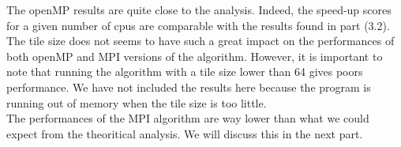 The openMP results are quite close to the analysis. Indeed, the speed-up scores for a given number of cpus are comparable with the results found in part (3.2). \\
 The tile size does not seems to have such a great impact on the performances of both openMP and MPI versions of the algorithm. However, it is important to note that running the algorithm with a tile size lower than 64 gives poors performance. We have not included the results here because the program is running out of memory when the tile size is too little. \\
The performances of the MPI algorithm are way lower than what we could expect from the theoritical analysis. We will discuss this in the next part.